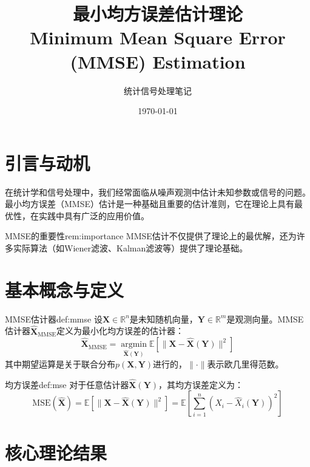 \documentclass[11pt]{article}
\title{\Large\textbf{最小均方误差估计理论\\{\normalsize Minimum Mean Square Error (MMSE) Estimation}}}
\author{统计信号处理笔记}
\date{\today}
\renewcommand{\vec}[1]{\bm{#1}}
\newcommand{\E}{\mathbb{E}}
\newcommand{\argmin}{\operatorname*{argmin}}
\newcommand{\reals}{\mathbb{R}}
\begin{document}
\maketitle

\tableofcontents
\vspace{0.5cm}

\section{引言与动机}

在统计学和信号处理中，我们经常面临从噪声观测中估计未知参数或信号的问题。最小均方误差（MMSE）估计是一种基础且重要的估计准则，它在理论上具有最优性，在实践中具有广泛的应用价值。

\begin{remark}{MMSE的重要性}{rem:importance}
MMSE估计不仅提供了理论上的最优解，还为许多实际算法（如Wiener滤波、Kalman滤波等）提供了理论基础。
\end{remark}

\section{基本概念与定义}

\begin{definition}{MMSE估计器}{def:mmse}
设$\vec{X} \in \reals^n$是未知随机向量，$\vec{Y} \in \reals^m$是观测向量。MMSE估计器$\hat{\vec{X}}_{\text{MMSE}}$定义为最小化均方误差的估计器：
\begin{equation}
\hat{\vec{X}}_{\text{MMSE}} = \argmin_{\hat{\vec{X}}(\vec{Y})} \E\left[ \|\vec{X} - \hat{\vec{X}}(\vec{Y})\|^2 \right]
\end{equation}
其中期望运算是关于联合分布$p(\vec{X}, \vec{Y})$进行的，$\|\cdot\|$表示欧几里得范数。
\end{definition}

\begin{definition}{均方误差}{def:mse}
对于任意估计器$\hat{\vec{X}}(\vec{Y})$，其均方误差定义为：
\begin{equation}
\text{MSE}(\hat{\vec{X}}) = \E\left[ \|\vec{X} - \hat{\vec{X}}(\vec{Y})\|^2 \right] = \E\left[ \sum_{i=1}^n (X_i - \hat{X}_i(\vec{Y}))^2 \right]
\end{equation}
\end{definition}

\section{核心理论结果}
\end{document}
